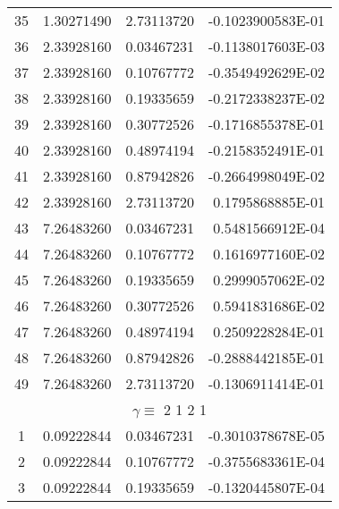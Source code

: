 \begin{longtable}{@{\extracolsep{\fill}}cllr@{}}
35  &  1.30271490  &  2.73113720  &  -0.1023900583E-01 \\

36  &  2.33928160  &  0.03467231  &  -0.1138017603E-03 \\

37  &  2.33928160  &  0.10767772  &  -0.3549492629E-02 \\

38  &  2.33928160  &  0.19335659  &  -0.2172338237E-02 \\

39  &  2.33928160  &  0.30772526  &  -0.1716855378E-01 \\

40  &  2.33928160  &  0.48974194  &  -0.2158352491E-01 \\

41  &  2.33928160  &  0.87942826  &  -0.2664998049E-02 \\

42  &  2.33928160  &  2.73113720  &   0.1795868885E-01 \\

43  &  7.26483260  &  0.03467231  &   0.5481566912E-04 \\

44  &  7.26483260  &  0.10767772  &   0.1616977160E-02 \\

45  &  7.26483260  &  0.19335659  &   0.2999057062E-02 \\

46  &  7.26483260  &  0.30772526  &   0.5941831686E-02 \\

47  &  7.26483260  &  0.48974194  &   0.2509228284E-01 \\

48  &  7.26483260  &  0.87942826  &  -0.2888442185E-01 \\

49  &  7.26483260  &  2.73113720  &  -0.1306911414E-01 \\

\midrule

\multicolumn{4}{c}{ $\gamma \equiv $  2 1 2 1} \\

\midrule

1  &  0.09222844  &  0.03467231  &  -0.3010378678E-05 \\

2  &  0.09222844  &  0.10767772  &  -0.3755683361E-04 \\

3  &  0.09222844  &  0.19335659  &  -0.1320445807E-04 \\


\end{longtable}

